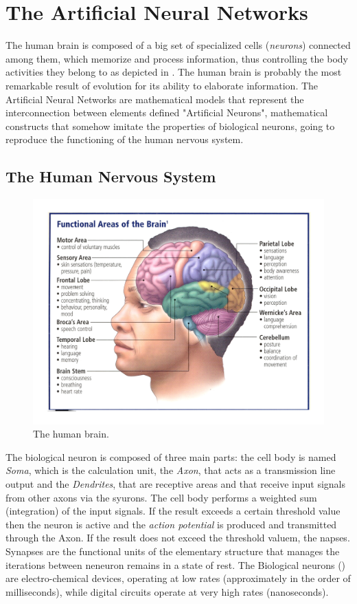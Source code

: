 \section{The Artificial Neural Networks}

The human brain is composed of a big set of specialized cells (\textit{neurons}) connected among them, which memorize and process information, thus controlling the body activities they belong to as depicted in . The human brain is probably the most remarkable result of evolution for its ability to elaborate information. 
The Artificial Neural Networks are mathematical models that represent the interconnection between elements defined "Artificial Neurons", mathematical constructs that somehow imitate the properties of biological neurons, going to reproduce the functioning of the human nervous system.

\subsection{The Human Nervous System} 

\begin{figure}[t]
\centering
\includegraphics[width=0.95\linewidth]{img/Brain}
\caption[Human Brain]{The human brain.}
\label{fig:brain}
\end{figure}

The biological neuron is composed of three main parts: the cell body is named \textit{Soma}, which is the calculation unit, the \textit{Axon}, that acts as a transmission line output and the \textit{Dendrites}, that are receptive areas and that receive input signals from other axons via the syurons. The cell body performs a weighted sum (integration) of the input signals. If the result exceeds a certain threshold value then the neuron is active and the \textit{action potential}  is produced and transmitted through the Axon. If the result does not exceed the threshold valuem, the napses. 
Synapses are the functional units of the elementary structure that manages the iterations between neneuron remains in a state of rest. 
The Biological neurons () are electro-chemical devices, operating at low rates (approximately in the order of milliseconds), while digital circuits operate at very high rates (nanoseconds).

